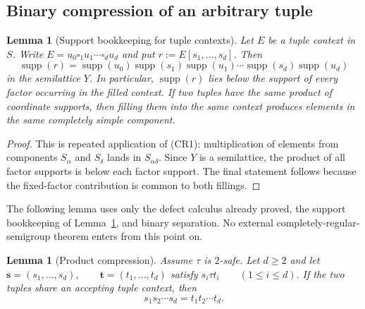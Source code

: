 \documentclass[10pt,a4paper]{article}
\newtheorem{lemma}[theorem]{Lemma}
\theoremstyle{definition}
\theoremstyle{remark}
\newcommand{\blank}{\square}
\begin{document}
\subsection{Binary compression of an arbitrary tuple}

\begin{lemma}[Support bookkeeping for tuple contexts]
\label{cr:lem:support-bookkeeping}
Let \(E\) be a tuple context in \(S\).  Write
\(E=u_0\blank_1u_1\cdots\blank_du_d\) and put \(r:=E[s_1,\ldots,s_d]\). Then
\[
\operatorname{supp}(r)
=\operatorname{supp}(u_0)\operatorname{supp}(s_1)\operatorname{supp}(u_1)\cdots
\operatorname{supp}(s_d)\operatorname{supp}(u_d)
\]
in the semilattice \(Y\). In particular,
\(\operatorname{supp}(r)\) lies below the support of every factor occurring
in the filled context. If two tuples have the same product of coordinate
supports, then filling them into the same context produces elements in the
same completely simple component.
\end{lemma}

\begin{proof}
This is repeated application of \textup{(CR1)}: multiplication of elements
from components \(S_\alpha\) and \(S_\delta\) lands in
\(S_{\alpha\delta}\). Since \(Y\) is a semilattice, the product of all
factor supports is below each factor support. The final statement follows
because the fixed-factor contribution is common to both fillings.
\end{proof}

The following lemma uses only the defect calculus already proved, the support
bookkeeping of Lemma~\ref{cr:lem:support-bookkeeping}, and binary separation.
No external completely-regular-semigroup theorem enters from this point on.

\begin{lemma}[Product compression]
\label{cr:lem:product-compression}
Assume $\tau$ is $2$-safe.  Let $d\ge2$ and let
\(\mathbf s=(s_1,\ldots,s_d), \qquad \mathbf t=(t_1,\ldots,t_d)\)
satisfy
\(s_i\tau t_i \qquad(1\le i\le d).\)
If the two tuples share an accepting tuple context, then
\begin{equation}
s_1s_2\cdots s_d
=
t_1t_2\cdots t_d.
\label{eq:cr-product-compression}
\end{equation}
\end{lemma}
\end{document}
